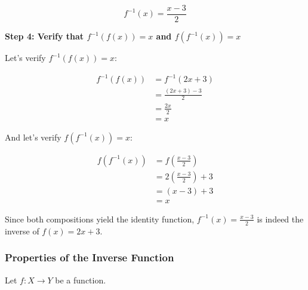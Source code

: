 \[
	f^{-1}(x) = \frac{x - 3}{2}
\]

\textbf{Step 4: Verify that \(f^{-1} (f (x)) = x\) and \(f(f^{-1} (x)) = x\)}

Let's verify \(f^{-1} (f (x)) = x\):

\begin{align*}
	f^{-1}(f(x)) & = f^{-1}(2x + 3)         \\
	             & = \frac{(2x + 3) - 3}{2} \\
	             & = \frac{2x}{2}           \\
	             & = x
\end{align*}

And let's verify \(f(f^{-1}(x)) = x\):

\begin{align*}
	f(f^{-1}(x)) & = f\left(\frac{x - 3}{2}\right)     \\
	             & = 2\left(\frac{x - 3}{2}\right) + 3 \\
	             & = (x - 3) + 3                       \\
	             & = x
\end{align*}

Since both compositions yield the identity function, \(f^{-1} (x) = \frac{x - 3}{2}\) is indeed the 
inverse of \(f (x) = 2x + 3\).

\subsubsection{Properties of the Inverse Function}

Let \(f:X\to Y\) be a function.

